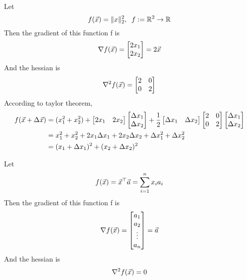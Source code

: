\begin{example}
	Let
	\[
f(\vec{x}) = \|x\|_2^2, \;\; f:=\mathbb{R}^2\rightarrow\mathbb{R}
	\]
	Then the gradient of this function f is
	\[
\nabla f(\vec{x}) = \begin{bmatrix}
	2x_1\\2x_2
\end{bmatrix} = 2\vec{x}
	\]
	And the hessian is
	\[
\nabla^2 f(\vec{x}) = \begin{bmatrix}
	2 & 0 \\ 0 & 2
\end{bmatrix}
	\]
	According to taylor theorem,
	\begin{align*}
		f(\vec{x}+\Delta\vec{x}) &= (x_1^2+x_2^2)+\begin{bmatrix}
	2x_1 &2x_2
\end{bmatrix}
\begin{bmatrix}
	\Delta x_1\\\Delta x_2
\end{bmatrix} + \frac{1}{2}\begin{bmatrix}
	\Delta x_1&\Delta x_2
\end{bmatrix}\begin{bmatrix}
	2 & 0 \\ 0 & 2
\end{bmatrix}\begin{bmatrix}
	\Delta x_1\\\Delta x_2
\end{bmatrix}\\
&= x_1^2+x_2^2+2x_1 \Delta x_1+2x_2 \Delta x_2 +\Delta x_1^2+ \Delta x_2^2\\
&= (x_1+\Delta x_1)^2 + (x_2+\Delta x_2)^2
	\end{align*}
\end{example}

\begin{example}
	Let
	\[
f(\vec{x}) = \vec{x}^\top\vec{a} = \sum_{i=1}^nx_ia_i
	\]
	Then the gradient of this function f is
	\[
\nabla f(\vec{x}) = \begin{bmatrix}
	a_1\\a_2\\\vdots\\a_n
\end{bmatrix} = \vec{a}
	\]
	And the hessian is
	\[
\nabla^2 f(\vec{x}) = 0
	\]
\end{example}

